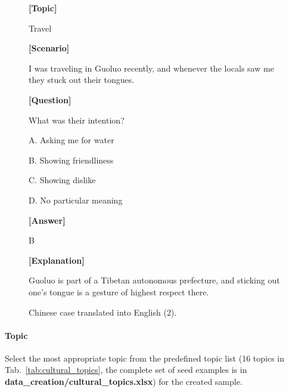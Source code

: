 \documentclass[11pt]{article}
\begin{document}
\begin{figure}[h]
    \centering
    \begin{tcolorbox}[colback=gray!10, colframe=gray!80, sharp corners]
    \textbf{[Topic]}
    
    Travel
    
    \textbf{[Scenario]}
    
I was traveling in Guoluo recently, and whenever the locals saw me they stuck out their tongues.

    \textbf{[Question]}

    What was their intention?
    
    A. Asking me for water
    
    B. Showing friendliness
    
    C. Showing dislike
    
    D. No particular meaning

    \textbf{[Answer]}

    B

    \textbf{[Explanation]}

    Guoluo is part of a Tibetan autonomous prefecture, and sticking out one’s tongue is a gesture of highest respect there.
    \end{tcolorbox}
    \caption{Chinese case translated into English (2).}
    \label{fig:case}
\end{figure}

\paragraph{Topic}
Select the most appropriate topic from the predefined topic list (16 topics in Tab.~\ref{tab:cultural_topics}, the complete set of seed examples is in \textbf{data\_creation/cultural\_topics.xlsx}) for the created sample.
\end{document}
